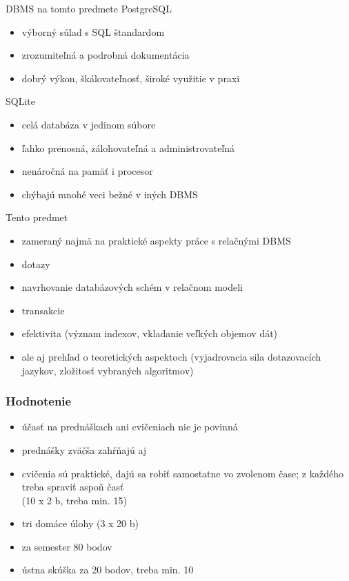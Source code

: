 \documentclass[12pt]{beamer}
\begin{document}
\begin{frame}{DBMS na tomto predmete}
PostgreSQL
\begin{itemize}
\item výborný súlad s SQL štandardom
\item zrozumiteľná a podrobná dokumentácia
\item dobrý výkon, škálovateľnosť, široké využitie v praxi
\end{itemize}
\bigskip

SQLite
\begin{itemize}
\item celá databáza v jedinom súbore
\item ľahko prenosná, zálohovateľná a administrovateľná
\item nenáročná na pamäť i procesor
\item chýbajú mnohé veci bežné v iných DBMS
\end{itemize}
\end{frame}

\begin{frame}{Tento predmet}
\begin{itemize}
\item zameraný najmä na praktické aspekty práce s relačnými DBMS
\item dotazy
\item navrhovanie databázových schém v relačnom modeli
\item transakcie
\item efektivita (význam indexov, vkladanie veľkých objemov dát)
\pause
\item ale aj prehľad o teoretických aspektoch (vyjadrovacia sila dotazovacích jazykov, zložitosť vybraných algoritmov)
\end{itemize}
\end{frame}

\begin{frame}
\frametitle{Hodnotenie}
\begin{itemize}
\item účasť na prednáškach ani cvičeniach nie je povinná
\item prednášky zväčša zahŕňajú aj 
\item cvičenia sú praktické, dajú sa robiť samostatne vo zvolenom čase; z každého treba spraviť aspoň časť\\ (10 x 2 b, treba min. 15)
\item tri domáce úlohy (3 x 20 b)
\item za semester 80 bodov
\item ústna skúška za 20 bodov, treba min. 10
\end{itemize}
\end{frame}
\end{document}
